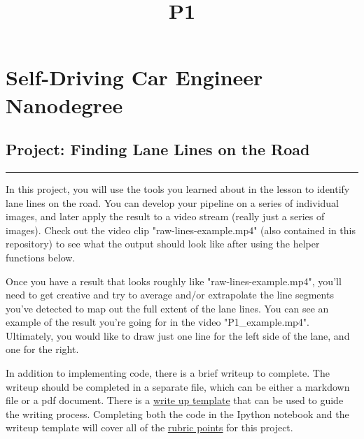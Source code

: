 \documentclass[11pt]{article}
\title{P1}
\begin{document}
    
    
    \maketitle
    
    

    
    \section{Self-Driving Car Engineer
Nanodegree}\label{self-driving-car-engineer-nanodegree}

\subsection{\texorpdfstring{Project: \textbf{Finding Lane Lines on the
Road}}{Project: Finding Lane Lines on the Road}}\label{project-finding-lane-lines-on-the-road}

\begin{center}\rule{0.5\linewidth}{\linethickness}\end{center}

In this project, you will use the tools you learned about in the lesson
to identify lane lines on the road. You can develop your pipeline on a
series of individual images, and later apply the result to a video
stream (really just a series of images). Check out the video clip
"raw-lines-example.mp4" (also contained in this repository) to see what
the output should look like after using the helper functions below.

Once you have a result that looks roughly like "raw-lines-example.mp4",
you'll need to get creative and try to average and/or extrapolate the
line segments you've detected to map out the full extent of the lane
lines. You can see an example of the result you're going for in the
video "P1\_example.mp4". Ultimately, you would like to draw just one
line for the left side of the lane, and one for the right.

In addition to implementing code, there is a brief writeup to complete.
The writeup should be completed in a separate file, which can be either
a markdown file or a pdf document. There is a
\href{https://github.com/udacity/CarND-LaneLines-P1/blob/master/writeup_template.md}{write
up template} that can be used to guide the writing process. Completing
both the code in the Ipython notebook and the writeup template will
cover all of the
\href{https://review.udacity.com/\#!/rubrics/322/view}{rubric points}
for this project.
\end{document}
